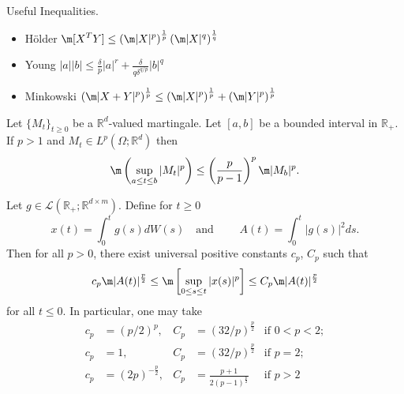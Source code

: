Useful Inequalities.
\begin{itemize}
	\item H\"older
		$ \displaystyle
			\m[X^T Y] \leq
			\left(
				\m|X|^p
			\right)^{\frac{1}{p}}		
			\left(
				\m|X|^q
			\right)^{\frac{1}{q}}
		 $
	\item Young
		$
			\displaystyle
			|a||b| 
			\leq
			\frac{\delta}{p} |a|^r
			+\frac{\delta}{q \delta^{q/p}} |b|^q
		$
	
	\item Minkowski
		$
			\displaystyle
			\left(
				\m |X+Y|^p
			\right)^{\frac{1}{p}}		
			\leq
			\left(
				\m |X|^p
			\right)^{\frac{1}{p}}
			+
			\left(
				\m |Y|^p
			\right)^{\frac{1}{p}}
		$	
\end{itemize}

\begin{thm}
	Let $\{M_t\}_{t\geq 0}$ be a $\mathbb{R}^d$-valued martingale. Let $[a,b]$ be a bounded interval in $
	\mathbb{R}_{+}$.
	If $p>1$ and $M_t\in L^p(\Omega;\mathbb{R}^d)$ then
	\begin{equation}
		\m\left( \sup_{a\leq t \leq b} |M_t|^p\right) 
		\leq \left(\frac{p}{p-1}\right)^p \m|M_b|^p. 
	\end{equation}

\end{thm}

\begin{thm}\label{thm:BDG}
	Let $g\in \mathcal{L}(\mathbb{R}_+; \mathbb{R}^{d\times m})$. Define for $t\geq 0$
	\begin{equation*}
		x(t) = \int_{0}^{t} g(s)dW(s) \quad \text{and } \qquad 
		A(t) = \int_{0}^{t} |g(s)|^2 ds.
	\end{equation*}
	Then for all $p>0$, there exist universal positive constants $c_p$, $C_p$ such that
	\begin{equation}
		c_p\m|{A(t)}|^{\frac{p}{2}}
		\leq
		\m \left[
		\sup_{0\leq s \leq t} |x(s)|^p
		\right]
		\leq 
		C_p \m |A(t)|^{\frac{p}{2}}
	\end{equation}
	for all $t\leq 0$.  In particular, one may take
	\begin{align*}
		c_p &= (p/2)^p, & 			 C_p &= (32/p)^{\frac{p}{2}} & \text{if } 0<p<2; \\
		c_p &= 1,       & 			 C_p &= (32/p)^{\frac{p}{2}} & \text{if } p=2; \\
		c_p &= (2p)^{-\frac{p}{2}},& C_p &= \frac{p+1}{2(p-1)^{\frac{p}{2}}} & \text{if } p>2 \\
	\end{align*}
\end{thm}


